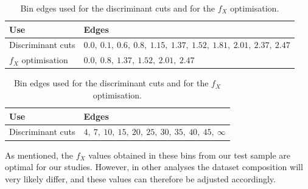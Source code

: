 \begin{table}[htbp]
  \centering
  \footnotesize
  \setlength{\tabcolsep}{5pt}
  \renewcommand{\arraystretch}{1.1}

  \begin{subtable}[t]{\linewidth}
    \centering
    \vspace{2pt}
    \begin{tabular}{@{}ll@{}}
      \toprule
      \textbf{Use} & \textbf{Edges} \\
      \midrule
      Discriminant cuts &
      $0.0,\ 0.1,\ 0.6,\ 0.8,\ 1.15,\ 1.37,\ 1.52,\ 1.81,\ 2.01,\ 2.37,\ 2.47$ \\
      $f_X$ optimisation &
      $0.0,\ 0.8,\ 1.37,\ 1.52,\ 2.01,\ 2.47$ \\
      \bottomrule
    \end{tabular}
  \end{subtable}

  \vspace{0.4cm} %

  \begin{subtable}[t]{\linewidth}
    \centering
    \vspace{2pt}
    \begin{tabular}{@{}ll@{}}
      \toprule
      \textbf{Use} & \textbf{Edges} \\
      \midrule
      Discriminant cuts &
      $4,\ 7,\ 10,\ 15,\ 20,\ 25,\ 30,\ 35,\ 40,\ 45,\ \infty$ \\
      \bottomrule
    \end{tabular}
  \end{subtable}
  \caption{Bin edges used for the discriminant cuts and for the $f_X$ optimisation.}
  \label{tune:binning}
\end{table}

As mentioned, the $f_{X}$ values obtained in these bins from our test sample are optimal for our studies. However, in other analyses the dataset composition will very likely differ, and these values can therefore be adjusted accordingly.  


